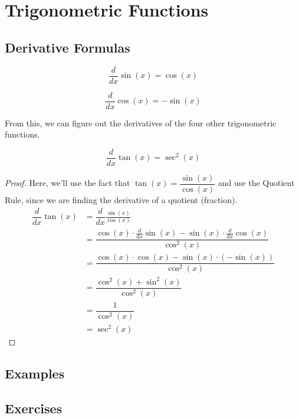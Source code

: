 \section{Trigonometric Functions}
\label{sec:trigderiv}

\subsection{Derivative Formulas}

\begin{theorem}
$$\dfrac{d}{dx}\sin(x) = \cos(x)$$

$$\dfrac{d}{dx}\cos(x) = -\sin(x)$$
\end{theorem}

From this, we can figure out the derivatives of the four other trigonometric functions.

\begin{theorem}
$$\dfrac{d}{dx}\tan(x) = \sec^2(x)$$
\end{theorem}
\begin{proof}
Here, we'll use the fact that $\tan(x) = \dfrac{\sin(x)}{\cos(x)}$ and use the Quotient Rule, since we are finding the derivative of a quotient (fraction).
\begin{align*}
    \dfrac{d}{dx}\tan(x) &= \dfrac{d}{dx}\frac{\sin(x)}{\cos(x)} \\
    &= \dfrac{\cos(x)\cdot\frac{d}{dx}\sin(x) - \sin(x)\cdot\frac{d}{dx}\cos(x)}{\cos^2(x)} \\
    &= \dfrac{\cos(x)\cdot\cos(x) - \sin(x)\cdot(-\sin(x))}{\cos^2(x)} \\
    &= \dfrac{\cos^2(x) + \sin^2(x)}{\cos^2(x)} \\
    &= \dfrac{1}{\cos^2(x)}\\
    &= \sec^2(x)
\end{align*}
\end{proof}

\subsection{Examples}

\subsection{Exercises}
